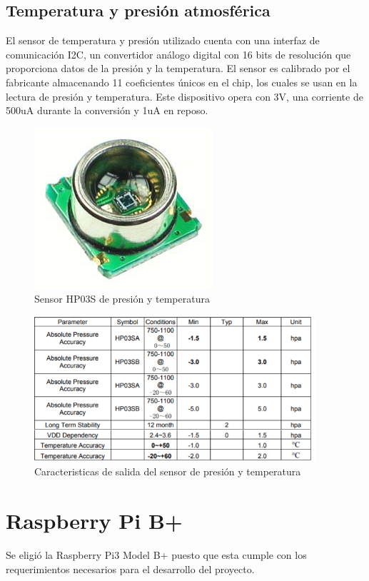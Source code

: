 \subsection{Temperatura y presión atmosférica}
El sensor de temperatura y presión utilizado cuenta con una interfaz de comunicación I2C, un convertidor análogo digital con 16 bits de resolución que proporciona datos de la presión y la temperatura. 
El sensor es calibrado por el fabricante almacenando 11 coeficientes únicos en el chip, los cuales se usan en la lectura de presión y temperatura. 
Este dispositivo opera con 3V, una corriente de 500uA durante la conversión y 1uA en reposo.

\begin{figure}[H]
\includegraphics[scale=0.7]{Figs/hp03s.jpg} 
\centering
\caption{Sensor HP03S de presión y temperatura ~\citep{HP03SDatasheet}}
\label{adecuacion}
\end{figure}

\begin{figure}[H]
\includegraphics[width=0.93\textwidth]{Figs/tabla_hp03s.PNG} 
\centering
\caption{Caracteristicas de salida del sensor de presión y temperatura ~\citep{HP03SDatasheet}}
\label{adecuacion}
\end{figure}



\section{Raspberry Pi B+}
Se eligió la Raspberry Pi3 Model B+ puesto que esta cumple con los requerimientos necesarios para el desarrollo del proyecto.

